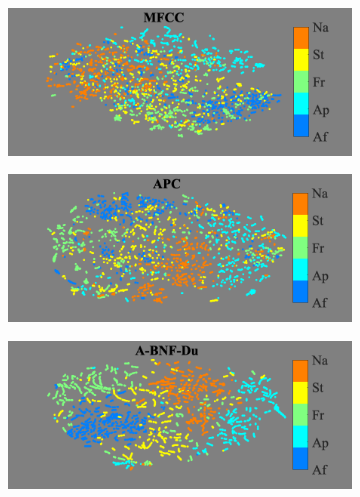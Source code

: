 \documentclass[transmag]{IEEEtran}
\begin{document}
\begin{table}[!t]
\label{table:analyses_pairwise_af_moa}
\end{table}
\begin{figure}[!t]
    \begin{subfigure}{0.49\linewidth}
	   \centering
	   \includegraphics[width=1\linewidth]{tsne_af_moa_mfcc_disc_bar_adjust_journal.png}
    \end{subfigure}
   \begin{subfigure}{0.49\linewidth}
	   \centering
	   \includegraphics[width=1\linewidth]{tsne_af_moa_apc_unlab_600_disc_bar_adjust_journal.png}
    \end{subfigure}
    \newline
   \begin{subfigure}{0.49\linewidth}
	   \centering
	   \includegraphics[width=1\linewidth]{tsne_af_moa_bnf_cgn_apc_input_disc_bar_adjust_journal.png}

\end{subfigure}
\end{figure}
\end{document}
